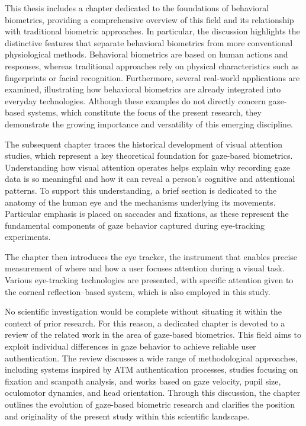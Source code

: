 \documentclass{article}
\begin{document}
This thesis includes a chapter dedicated to the foundations of behavioral biometrics, providing a comprehensive overview of this field and its relationship with traditional biometric approaches.
In particular, the discussion highlights the distinctive features that separate behavioral biometrics from more conventional physiological methods.
Behavioral biometrics are based on human actions and responses, whereas traditional approaches rely on physical characteristics such as fingerprints or facial recognition.
Furthermore, several real-world applications are examined, illustrating how behavioral biometrics are already integrated into everyday technologies. 
Although these examples do not directly concern gaze-based systems, which constitute the focus of the present research, they demonstrate the growing importance and versatility of this emerging discipline.

The subsequent chapter traces the historical development of visual attention studies, which represent a key theoretical foundation for gaze-based biometrics. 
Understanding how visual attention operates helps explain why recording gaze data is so meaningful and how it can reveal a person’s cognitive and attentional patterns. 
To support this understanding, a brief section is dedicated to the anatomy of the human eye and the mechanisms underlying its movements. 
Particular emphasis is placed on saccades and fixations, as these represent the fundamental components of gaze behavior captured during eye-tracking experiments.

The chapter then introduces the eye tracker, the instrument that enables precise measurement of where and how a user focuses attention during a visual task. 
Various eye-tracking technologies are presented, with specific attention given to the corneal reflection–based system, which is also employed in this study.

No scientific investigation would be complete without situating it within the context of prior research. 
For this reason, a dedicated chapter is devoted to a review of the related work in the area of gaze-based biometrics. 
This field aims to exploit individual differences in gaze behavior to achieve reliable user authentication. 
The review discusses a wide range of methodological approaches, including systems inspired by ATM authentication processes, studies focusing on fixation and scanpath analysis, and works based on gaze velocity, pupil size, oculomotor dynamics, and head orientation.
Through this discussion, the chapter outlines the evolution of gaze-based biometric research and clarifies the position and originality of the present study within this scientific landscape.
\end{document}
